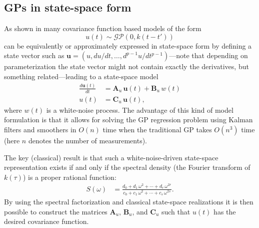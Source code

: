 \documentclass[journal]{IEEEtran}
\begin{document}
\subsection{GPs in state-space form}
As shown in \cite{Hartikainen+Sarkka:2010,Sarkka+Solin+Hartikainen:2013,Sarkka+Piche:2014} many covariance function based models of the form
%
\begin{equation}
  u(t) \sim \mathcal{GP}(0,k(t - t'))
\end{equation}
%
can be equivalently or approximately expressed in state-space form by defining a state vector such as $\mathbf{u} = (u, du/dt,\ldots,d^{p-1}u/dt^{p-1})$---note that depending on parameterization the state vector might not contain exactly the derivatives, but something related---leading to a state-space model
%
\begin{equation}
\begin{split}
  \frac{d\mathbf{u}(t)}{dt}
  &= \mathbf{A}_u \, \mathbf{u}(t) + \mathbf{B}_u \, w(t) \\
  u(t) &= \mathbf{C}_u \, \mathbf{u}(t),
\end{split}
\label{eq:ssu}
\end{equation}
%
where $w(t)$ is a white-noise process. The advantage of this kind of model formulation is that it allows for solving the GP regression problem using Kalman filters and smoothers \cite{Sarkka:2013} in $O(n)$ time when the traditional GP takes $O(n^3)$ time (here $n$ denotes the number of measurements).

The key (classical) result is that such a white-noise-driven state-space representation exists if and only if the spectral density (the Fourier transform of $k(\tau)$) is a proper rational function:
%
\begin{equation}
\begin{split}
  S(\omega) &= \frac{d_0 + d_1 \, \omega^2 + \cdots + d_r \, \omega^{2r}}{c_0 + c_1 \, \omega^2 + \cdots + c_s \, \omega^{2s}}.
\end{split}
\end{equation}
%
By using the spectral factorization and classical state-space realizations \cite{Sarkka+Solin+Hartikainen:2013} it is then possible to construct the matrices $\mathbf{A}_u$, $\mathbf{B}_u$, and $\mathbf{C}_u$ such that $u(t)$ has the desired covariance function. 
\end{document}
